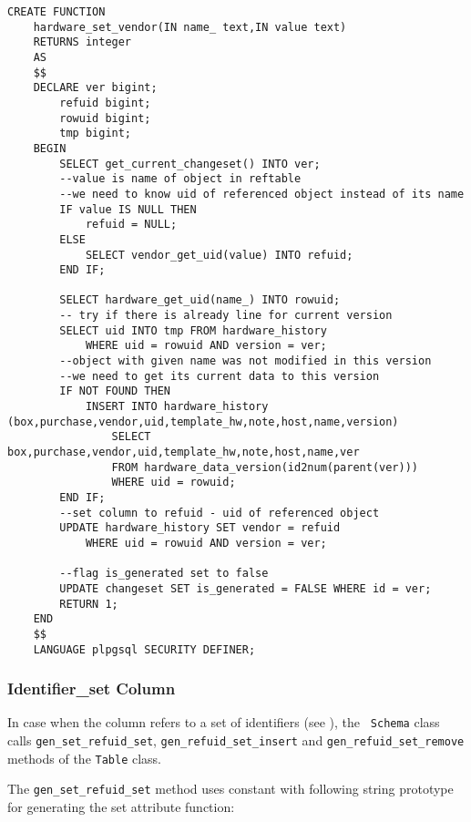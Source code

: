 \documentclass[deska]{subfiles}
\begin{document}
\begin{verbatim}
CREATE FUNCTION
    hardware_set_vendor(IN name_ text,IN value text)
    RETURNS integer
    AS
    $$
    DECLARE ver bigint;
        refuid bigint;
        rowuid bigint;
        tmp bigint;
    BEGIN
        SELECT get_current_changeset() INTO ver;
        --value is name of object in reftable
        --we need to know uid of referenced object instead of its name
        IF value IS NULL THEN
            refuid = NULL;
        ELSE
            SELECT vendor_get_uid(value) INTO refuid;
        END IF;

        SELECT hardware_get_uid(name_) INTO rowuid;
        -- try if there is already line for current version
        SELECT uid INTO tmp FROM hardware_history
            WHERE uid = rowuid AND version = ver;
        --object with given name was not modified in this version
        --we need to get its current data to this version
        IF NOT FOUND THEN
            INSERT INTO hardware_history (box,purchase,vendor,uid,template_hw,note,host,name,version)
                SELECT box,purchase,vendor,uid,template_hw,note,host,name,ver
                FROM hardware_data_version(id2num(parent(ver)))
                WHERE uid = rowuid;
        END IF;
        --set column to refuid - uid of referenced object
        UPDATE hardware_history SET vendor = refuid
            WHERE uid = rowuid AND version = ver;

        --flag is_generated set to false
        UPDATE changeset SET is_generated = FALSE WHERE id = ver;
        RETURN 1;
    END
    $$
    LANGUAGE plpgsql SECURITY DEFINER;
\end{verbatim}

\subsubsection{Identifier\_set Column}

In case when the column refers to a set of identifiers (see ), the {\tt
Schema} class calls {\tt gen\_set\_refuid\_set},  {\tt gen\_refuid\_set\_insert} and {\tt gen\_refuid\_set\_remove}
methods of the {\tt Table} class.

The {\tt gen\_set\_refuid\_set} method uses constant with following string prototype for generating the set attribute
function:
\end{document}
